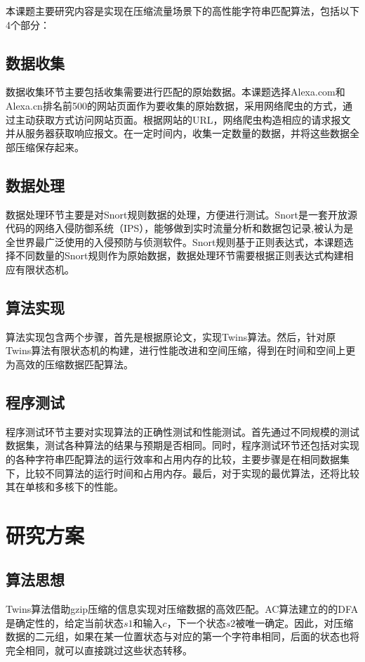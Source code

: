 本课题主要研究内容是实现在压缩流量场景下的高性能字符串匹配算法，包括以下4个部分：

\subsection{数据收集}
数据收集环节主要包括收集需要进行匹配的原始数据。本课题选择Alexa.com和Alexa.cn排名前500的网站页面作为要收集的原始数据，采用网络爬虫的方式，通过主动获取方式访问网站页面。根据网站的URL，网络爬虫构造相应的请求报文并从服务器获取响应报文。在一定时间内，收集一定数量的数据，并将这些数据全部压缩保存起来。

\vspace{3mm}
\subsection{数据处理}
数据处理环节主要是对Snort规则数据的处理，方便进行测试。Snort\cite{roesch1999snort}是一套开放源代码的网络入侵防御系统（IPS），能够做到实时流量分析和数据包记录,被认为是全世界最广泛使用的入侵预防与侦测软件。Snort规则基于正则表达式，本课题选择不同数量的Snort规则作为原始数据，数据处理环节需要根据正则表达式构建相应有限状态机。

\vspace{3mm}
\subsection{算法实现}
算法实现包含两个步骤，首先是根据原论文，实现Twins算法。然后，针对原Twins算法有限状态机的构建，进行性能改进和空间压缩，得到在时间和空间上更为高效的压缩数据匹配算法。

\vspace{3mm}
\subsection{程序测试}
程序测试环节主要对实现算法的正确性测试和性能测试。首先通过不同规模的测试数据集，测试各种算法的结果与预期是否相同。同时，程序测试环节还包括对实现的各种字符串匹配算法的运行效率和占用内存的比较，主要步骤是在相同数据集下，比较不同算法的运行时间和占用内存。最后，对于实现的最优算法，还将比较其在单核和多核下的性能。


\vspace{8mm}
\section{研究方案}

\subsection{算法思想}
Twins算法\cite{sun2020efficient}借助gzip压缩的信息实现对压缩数据的高效匹配。AC算法建立的的DFA是确定性的，给定当前状态$s1$和输入$c$，下一个状态$s2$被唯一确定。因此，对压缩数据的二元组，如果在某一位置状态与对应的第一个字符串相同，后面的状态也将完全相同，就可以直接跳过这些状态转移。

